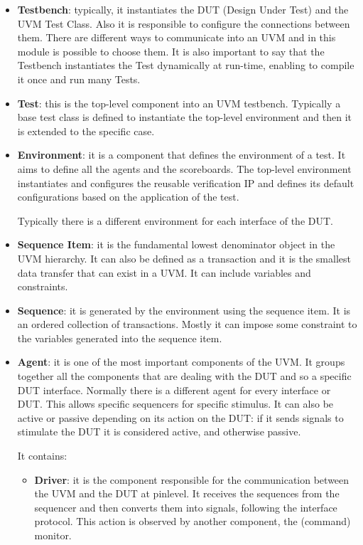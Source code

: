 \begin{itemize}
    \item \textbf{Testbench}: typically, it instantiates the DUT (Design Under Test) and the UVM Test Class. Also it is responsible to configure the connections between them.
    There are different ways to communicate into an UVM and in this module is possible to choose them.
    It is also important to say that the Testbench instantiates the Test dynamically at run-time, enabling to compile it once and run many Tests.
    
    \item \textbf{Test}: this is the top-level component into an UVM testbench.
    Typically a base test class is defined to instantiate the top-level environment and then it is extended to the specific case.
    
    \item \textbf{Environment}: it is a component that defines the environment of a test. It aims to define all the agents and the scoreboards. 
    The top-level environment instantiates and configures the reusable verification IP and defines its default configurations based on the application of the test.
    
    Typically there is a different environment for each interface of the DUT.
    
    \item \textbf{Sequence Item}: it is the fundamental lowest denominator object in the UVM hierarchy. It can also be defined as a transaction and it is the smallest data transfer that can exist in a UVM. It can include variables and constraints.
    
    
    \item \textbf{Sequence}: it is generated by the environment using the sequence item. It is an ordered collection of transactions.
    Mostly it can impose some constraint to the variables generated into the sequence item.
    
    \item \textbf{Agent}: it is one of the most important components of the UVM. It groups together all the components that are dealing with the DUT and so a specific DUT interface.
    Normally there is a different agent for every interface or DUT. This allows specific sequencers for specific stimulus.
    It can also be active or passive depending on its action on the DUT: if it sends signals to stimulate the DUT it is considered active, and otherwise passive.
    
    It contains:
    \begin{itemize}
        \item \textbf{Driver}: it is the component responsible for the communication between the UVM and the DUT at pinlevel. It receives the sequences from the sequencer and then converts them into signals, following the interface protocol.
        This action is observed by another component, the (command) monitor.
        

\end{itemize}
\end{itemize}
